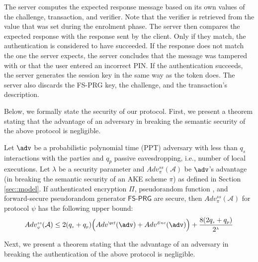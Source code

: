 \documentclass[runningheads]{llncs}
\newcommand{\sss}{\scriptscriptstyle}
\newcommand{\A}{\mathcal{A}}
\begin{document}
The server computes the expected response message based on its own values of the challenge, transaction, and verifier. Note that the verifier is retrieved from the value that was set during the enrolment phase. The server then compares the expected response with the response sent by the client. Only if they match, the authentication is considered to have succeeded. If the response does not match the one the server expects, the server concludes that the message was tampered with or that the user entered an incorrect PIN. If the authentication succeeds, the server generates the session key in the same way as the token does.  The server also discards the FS-PRG key, the challenge, and the transaction's description.

%
Below, we formally state the security of our protocol.  First, we present a theorem stating that the advantage of an adversary in breaking the semantic security of the above protocol is negligible.  
\begin{theorem}[Semantic Security]
Let $\adv$ be a probabilistic polynomial time (PPT) adversary with less than $q_{\sss s}$ interactions with the parties and $q_{\sss p}$ passive eavesdropping, i.e., number of local executions. Let $\lambda$ be a security parameter and $Adv_{\sss\pi}^{\sss ss}(\A)$ be  $\adv$'s advantage (in breaking the semantic security of an AKE scheme $\pi$) as defined in Section \ref{sec::model}. If authenticated encryption $\Pi$, pseudorandom function \prf,  and forward-secure pseudorandom generator  $\mathsf{FS\text{-}PRG}$ are secure, then $Adv_{\sss\pi}^{\sss ss}(\A)$ for protocol $\psi$ has the following upper bound:  
%
\begin{equation*} 
Adv_{\sss \psi}^{\sss ss}(\A) \leq 2(q_{\sss s}+q_{\sss p})\Big(Adv^{\sss\prf}(\adv)+Adv^{\sss Enc}(\adv)\Big)+\frac{8(2q_{\sss s}+q_{\sss p})}{2^{\sss\lambda}}
\end{equation*}
%
\end{theorem}

Next, we present a theorem stating that the advantage of an adversary in breaking the authentication of the above protocol is negligible.  
\end{document}
